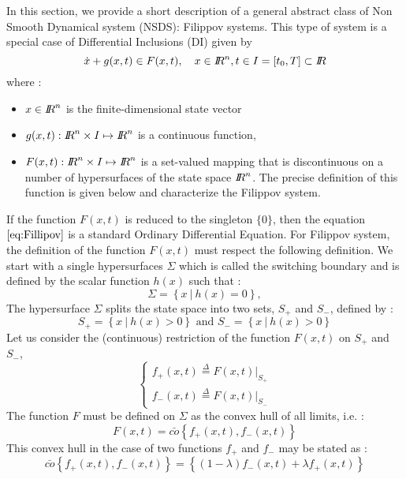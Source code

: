 \documentclass[10pt]{article}
\begin{document}
In this section, we provide a short description of a general abstract class of Non Smooth Dynamical system (NSDS): Filippov systems.  This type of system is a special case of Differential Inclusions (DI) given by 
\begin{equation}
  \label{eq:Fillipov}
  \dot x + g(x,t) \in F(x,t), \quad x\in \RR^n, t\in I = [t_0,T] \subset \RR
\end{equation}
where :
\begin{itemize}
\item $x \in \mbox{\rm $I\!\!R$}^n$ is the finite-dimensional state vector
\item $g(x,t) : \mbox{\rm $I\!\!R$}^n\times I \mapsto \mbox{\rm $I\!\!R$}^n $ is a continuous function,
\item $F(x,t) :\mbox{\rm $I\!\!R$}^n\times I \mapsto \mbox{\rm $I\!\!R$}^n $  is a set-valued mapping that is discontinuous on a number of hypersurfaces of the state space $\mbox{\rm $I\!\!R$}^n$. The precise definition of this function is given below and characterize the Filippov system.
\end{itemize}
If the function $F(x,t)$ is reduced to the singleton $\{0\}$, then the equation $\ref{eq:Fillipov}$ is a standard Ordinary Differential Equation. For Filippov system, the definition of the function $F(x,t)$ must respect the following definition. We start with a single hypersurfaces $\Sigma$ which is called the switching boundary and is defined by the scalar function $h(x)$ such that :
\begin{equation}
\Sigma = \left\{x \ | \ h(x) = 0 \right\},
\end{equation}
The hypersurface  $\Sigma$ splits the state space into two sets, $S_+$ and $S_-$, defined by :
\begin{equation}
S_+ = \left\{x \ | \ h(x) > 0 \right\} \text{ and } S_- = \left\{x \ | \ h(x) > 0 \right\}
\end{equation}
Let us consider the (continuous) restriction of the function $F(x,t)$ on  $S_+$ and $S_-$,
\begin{equation}
  \begin{cases}
    f_+(x,t) \stackrel{\Delta}{=} F(x,t)|_{S_+}\\
    f_-(x,t) \stackrel{\Delta}{=} F(x,t)|_{S_-}
  \end{cases}
\end{equation}
The function $F$ must be defined on $\Sigma$ as the convex hull of all limits, i.e. :
\begin{equation}
  F(x,t) = \bar{co}\left\{f_+(x,t), f_-(x,t)\right\}
\end{equation}
This convex hull in the case of two functions $f_+$ and $f_-$ may be stated as :
\begin{equation}
  \bar{co}\left\{f_+(x,t), f_-(x,t)\right\} = \left\{(1-\lambda) f_-(x,t) + \lambda f_+(x,t) \right\}
\end{equation}
\end{document}

